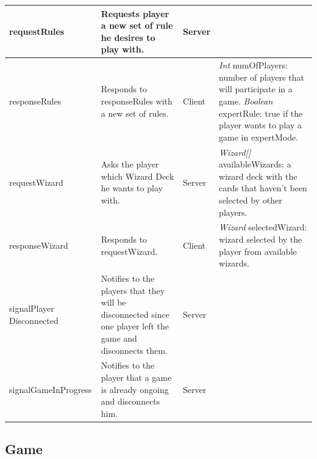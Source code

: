 \documentclass[12pt]{article}
\begin{document}
\begin{longtable}{>{\raggedright\arraybackslash}p{}|>{\raggedright\arraybackslash}p{}|l|>{\raggedright\arraybackslash}p{}}
				requestRules & Requests player a new set of rule he desires to play with. &
				Server & \\
				\midrule
				responseRules & Responds to responseRules with a new set of rules. & 
				Client & \emph{Int} numOfPlayers: number of players that will participate in a game. \newline
				\emph{Boolean} expertRule: true if the player wants to play a game in expertMode. \\
				\midrule
				requestWizard & Asks the player which Wizard Deck he wants to play with. & 
				Server & \emph{Wizard[]} availableWizards: a wizard deck with the cards that haven’t been selected by other players. \\
				\midrule
				responseWizard & Responds to requestWizard. &
				Client & \emph{Wizard} selectedWizard: wizard selected by the player from available wizards. \\
				\midrule
				signalPlayer Disconnected & Notifies to the players that they will be disconnected since one player left the game and disconnects them. &
				Server & \\
				\midrule
				signalGameInProgress & Notifies to the player that a game is already ongoing and disconnects him. &
				Server & \\
			\end{longtable}
	
			\newpage
	
		\subsection{Game}
	
\end{document}

